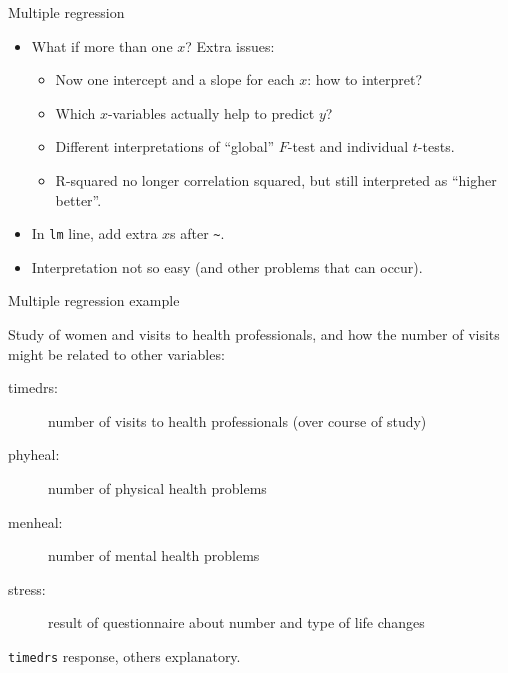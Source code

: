 \documentclass[unknownkeysallowed]{beamer}\usepackage[]{graphicx}\usepackage[]{color}
\begin{document}
\begin{frame}[fragile]{Multiple regression}

  \begin{itemize}
  \item What if more than one $x$? Extra issues: %
    \begin{itemize}
    \item Now one intercept and a slope for each $x$: how to interpret?
    \item Which $x$-variables actually help to predict $y$?

    \item Different interpretations of ``global'' $F$-test and individual $t$-tests.
    \item R-squared no longer correlation squared, but still
      interpreted as ``higher better''.
    \end{itemize}
  \item In \verb-lm- line, add extra $x$s after \verb-~-.
  \item Interpretation not so easy (and other problems that can occur).
  \end{itemize}

\end{frame}

\begin{frame}[fragile]{Multiple regression example}

Study of women and visits to health professionals, and how the number of visits might be related to other variables:

\begin{description}
\item[timedrs:] number of visits to health professionals (over course of study)
\item[phyheal:] number of physical health problems
\item[menheal:] number of mental health problems
\item[stress:] result of questionnaire about number and type of life changes
\end{description}

\verb-timedrs- response, others explanatory.

\end{frame}
\end{document}
